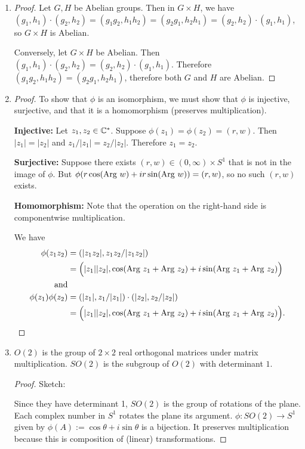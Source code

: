 \documentclass[12pt]{article}
\begin{document}
\begin{enumerate}
\item
  \begin{proof}
    Let $G, H$ be Abelian groups. Then in $G \times H$, we have
    $(g_1, h_1) \cdot (g_2, h_2) = (g_1g_2, h_1h_2) = (g_2g_1, h_2h_1) = (g_2, h_2) \cdot (g_1,
    h_1)$, so $G \times H$ is Abelian.

    Conversely, let $G \times H$ be Abelian. Then
    $(g_1, h_1) \cdot (g_2, h_2) = (g_2, h_2) \cdot (g_1, h_1)$. Therefore
    $(g_1g_2, h_1h_2) = (g_2g_1, h_2h_1)$, therefore both $G$ and $H$ are Abelian.
  \end{proof}
\item
  \begin{proof}
    To show that $\phi$ is an isomorphism, we must show that $\phi$ is injective, surjective, and
    that it is a homomorphism (preserves multiplication).

    \textbf{Injective:} Let $z_1, z_2 \in \mathbb{C}^*$. Suppose $\phi(z_1) = \phi(z_2) = (r, w)$. Then
    $|z_1| = |z_2|$ and $z_1/|z_1| = z_2/|z_2|$. Therefore $z_1 = z_2$.

    \textbf{Surjective:} Suppose there exists $(r, w) \in (0, \infty) \times S^1$ that is not in
    the image of $\phi$. But $\phi(r\cos(\text{Arg}~ w) + ir\sin(\text{Arg}~ w)) = (r, w)$, so no such $(r, w)$
    exists.

    \textbf{Homomorphism:} Note that the operation on the right-hand side is componentwise
    multiplication.

    We have
    \begin{align*}
     \phi(z_1z_2) &= (|z_1z_2|, z_1z_2/|z_1z_2|)\\
                  &= \Big(|z_1||z_2|, \cos(\text{Arg}~ z_1 + \text{Arg}~ z_2) + i\sin(\text{Arg}~ z_1 + \text{Arg}~ z_2)\Big)\\
      \text{and}\\
     \phi(z_1)\phi(z_2) &= (|z_1|, z_1/|z_1|)\cdot (|z_2|, z_2/|z_2|)\\
                  &= \Big(|z_1||z_2|, \cos(\text{Arg}~ z_1 + \text{Arg}~ z_2) + i\sin(\text{Arg}~ z_1 + \text{Arg}~ z_2)\Big).
    \end{align*}
  \end{proof}
\item
  \newpage
  \begin{definition*}
    $O(2)$ is the group of $2\times 2$ real orthogonal matrices under matrix
    multiplication. $SO(2)$ is the subgroup of $O(2)$ with determinant $1$.
  \end{definition*}

  \begin{proof}
    Sketch:

    Since they have determinant 1, $SO(2)$ is the group of rotations of the plane. Each complex
    number in $S^1$ rotates the plane its argument.  $\phi:SO(2) \to S^1$ given by
    $\phi(A) := \cos\theta + i\sin\theta$ is a bijection. It preserves multiplication because this
    is composition of (linear) transformations.

  \end{proof}
\end{enumerate}
\end{document}
